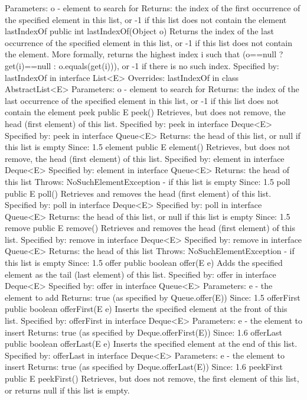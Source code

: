 \documentclass[babel]{book}
\begin{document}
Parameters:
o - element to search for
Returns:
the index of the first occurrence of the specified element in this list, or -1 if this list does not contain the element
lastIndexOf
public int lastIndexOf(Object o)
Returns the index of the last occurrence of the specified element in this list, or -1 if this list does not contain the element. More formally, returns the highest index i such that (o==null ? get(i)==null : o.equals(get(i))), or -1 if there is no such index.
Specified by:
lastIndexOf in interface List<E>
Overrides:
lastIndexOf in class AbstractList<E>
Parameters:
o - element to search for
Returns:
the index of the last occurrence of the specified element in this list, or -1 if this list does not contain the element
peek
public E peek()
Retrieves, but does not remove, the head (first element) of this list.
Specified by:
peek in interface Deque<E>
Specified by:
peek in interface Queue<E>
Returns:
the head of this list, or null if this list is empty
Since:
1.5
element
public E element()
Retrieves, but does not remove, the head (first element) of this list.
Specified by:
element in interface Deque<E>
Specified by:
element in interface Queue<E>
Returns:
the head of this list
Throws:
NoSuchElementException - if this list is empty
Since:
1.5
poll
public E poll()
Retrieves and removes the head (first element) of this list.
Specified by:
poll in interface Deque<E>
Specified by:
poll in interface Queue<E>
Returns:
the head of this list, or null if this list is empty
Since:
1.5
remove
public E remove()
Retrieves and removes the head (first element) of this list.
Specified by:
remove in interface Deque<E>
Specified by:
remove in interface Queue<E>
Returns:
the head of this list
Throws:
NoSuchElementException - if this list is empty
Since:
1.5
offer
public boolean offer(E e)
Adds the specified element as the tail (last element) of this list.
Specified by:
offer in interface Deque<E>
Specified by:
offer in interface Queue<E>
Parameters:
e - the element to add
Returns:
true (as specified by Queue.offer(E))
Since:
1.5
offerFirst
public boolean offerFirst(E e)
Inserts the specified element at the front of this list.
Specified by:
offerFirst in interface Deque<E>
Parameters:
e - the element to insert
Returns:
true (as specified by Deque.offerFirst(E))
Since:
1.6
offerLast
public boolean offerLast(E e)
Inserts the specified element at the end of this list.
Specified by:
offerLast in interface Deque<E>
Parameters:
e - the element to insert
Returns:
true (as specified by Deque.offerLast(E))
Since:
1.6
peekFirst
public E peekFirst()
Retrieves, but does not remove, the first element of this list, or returns null if this list is empty.
\end{document}
